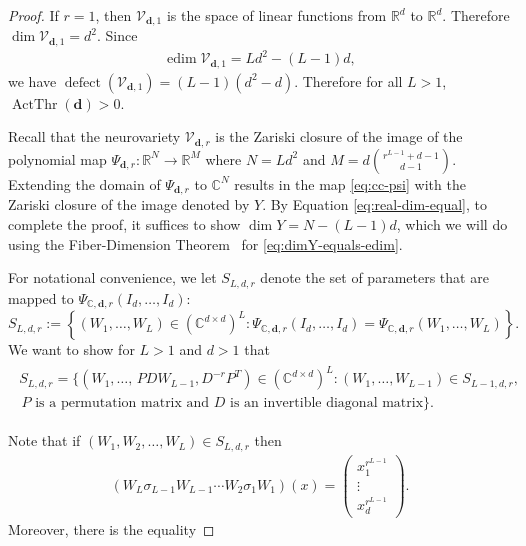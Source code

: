 \documentclass[12pt]{article}
\theoremstyle{definition}
\DeclareMathOperator{\ActThr}{ActThr}
\DeclareMathOperator{\defect}{defect}
\newcommand{\bfd}{\mathbf{d}}
\newcommand{\complexPsiMap}{\Psi_{{\mathbb{C},\mathbf{d},r}}}
\newcommand{\edim}[1]{\operatorname{edim}{#1}}
\renewcommand{\dim}[1]{\operatorname{dim}{#1}}
\begin{document}
\begin{proof}
If $r=1$, then $\mathcal{V}_{\mathbf{d},1}$ is the space of linear functions from $\mathbb{R}^{d}$ to $\mathbb{R}^d$. Therefore $\dim{\mathcal{V}_{\mathbf{d},1}} = d^2$. 
Since \begin{align*}
 \edim{\mathcal{V}_{\mathbf{d},1}} =  Ld^2 - (L-1)d,
\end{align*}
we have  $\defect(\mathcal{V}_{\mathbf{d},1})=(L-1)(d^2 - d)$. Therefore for all $L>1$, $\ActThr(\bfd)>0$.

\smallskip

Recall that the neurovariety $\mathcal{V}_{\bfd,r}$  is the Zariski closure of the image of the polynomial map 
$\Psi_{\mathbf{d},r}:\mathbb{R}^{N}\to\mathbb{R}^M$
where $N=Ld^2$ and $M={d \binom{r^{L-1}+d-1}{d-1}}$. 
Extending the domain of $\Psi_{\mathbf{d},r}$ to $\mathbb{C}^N$ 
results in the map \eqref{eq:cc-psi}
with the Zariski closure of the image denoted by $Y$. 
By Equation \eqref{eq:real-dim-equal},
to complete the proof, 
 it suffices to show $\dim{Y}=N-(L-1)d$, which we will do using the Fiber-Dimension Theorem~\cite[Theorem~1.25]{Shafarevich-Hirsch} for \eqref{eq:dimY-equals-edim}.

For notational convenience, we let 
$S_{L,d,r}$ denote the set of parameters that are mapped to $\complexPsiMap(I_d,\dots,I_d)$:
\begin{equation}\label{eq:S-fiber}
S_{L,d,r}:=
\left\{
(W_1,\dots,W_L)\in \left(\mathbb{C}^{d\times d}\right)^L:
\complexPsiMap(I_d,\dots,I_d)
=
\complexPsiMap(W_1,\dots,W_L)
\right\}.
\end{equation}
We want to show for $L>1$ and $d>1$ that
\begin{align}\label{eq:induction-step}
\begin{split}
S_{L,d,r}=
\Big\{
(W_1,\dots,\,
PDW_{L-1},
D^{-r} P^T)
\in \left(\mathbb{C}^{d\times d}\right)^L:
(W_1,\dots,W_{L-1})\in S_{L-1,d,r},&\\
\,P \text{ is a permutation matrix and }
D\text{ is an invertible diagonal matrix}
\Big\}.
\end{split}
\end{align}



Note that if  $(W_1,W_2,\dotsc,W_L)\in S_{L,d,r}$ then
\begin{align*}
(W_L\sigma_{L-1}W_{L-1}\dotsb W_2\sigma_1 W_1)(x) = \begin{pmatrix}
x_1^{r^{L-1}}\\
\vdots\\
x_d^{r^{L-1}}
\end{pmatrix}.
\end{align*}
Moreover, there is the equality




\end{proof}
\end{document}
